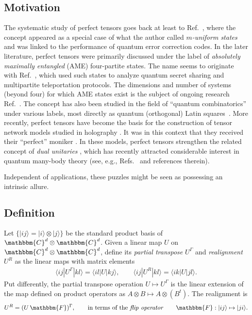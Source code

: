 \documentclass[aps,nofootinbib,floatfix,a4paper]{revtex4}
\newcommand{\1}{\mbox{$\mathbf{1}$}}
\def\CC{\mathbbm{C}}
\def\FF{\mathbbm{F}}
\begin{document}
\subsection{Motivation}

The systematic study of perfect tensors goes back at least to Ref.~\cite{Scott2004Multipartite}, where the concept appeared as a special case of what the author called \emph{$m$-uniform states} and was linked to the performance of quantum error correction codes.
In the later literature, perfect tensors were primarily discussed under the label of \emph{absolutely maximally entangled} (AME) four-partite states.
The name seems to originate with Ref.~\cite{Helwig2012Absolute}, which used such states to analyze quantum secret sharing and multipartite teleportation protocols.
The dimensions and number of systems 
(beyond four) 
for which AME states exist is the subject of ongoing research Ref.~\cite{Huber2018Bounds, huberAME, 
raissi2020constructions,
kwon2025continuous}.
The concept has also been studied in the field of ``quantum combinatorics'' 
\cite{Zauner1999Quantum}
under various labels, most directly as 
quantum (orthogonal) Latin squares~\cite{Musto2015Quantum, Musto2019Orthogonality, Goyeneche2018Entanglement, clarisse2005entangling,Zyczkowski2021Genuinely}.
More recently, perfect tensors have become the basis for the construction of tensor network models studied in holography \cite{pastawski2015holographic,latorre2015holographic}. 
It was in this context that they received their ``perfect'' moniker \cite{pastawski2015holographic}.
In these models, perfect tensors strengthen 
\cite{Rather2021From}
the related concept of \emph{dual unitaries} \cite{Bertini2019Exact}, which has recently attracted considerable interest in quantum many-body theory
(see, e.g., Refs.~\cite{Claeys2021Ergodic,
Pappalardi2024Quantum,
Rather2021From,
Yu2024Hierarchical}
and references therein). 

Independent of applications, these puzzles might be seen as possessing an intrinsic allure.

\subsection{Definition}
\label{sec:definition}

Let $\{|ij\rangle = |i\rangle\otimes |j\rangle\}$ be the standard product basis of $\CC^d\otimes \CC^d$.
Given a linear map $U$ on $\CC^d\otimes\CC^d$, 
define its \emph{partial transpose} $U^\Gamma$ and \emph{realignment} $U^R$ as the linear maps with matrix elements
\begin{align*}
	\langle ij|U^\Gamma|kl\rangle = \langle il|U|kj\rangle, %
	\qquad
	\langle ij|U^R|kl\rangle = \langle ik|U|jl\rangle.
\end{align*}
Put differently,
the partial transpose operation $U\mapsto U^\Gamma$ is the linear extension of the map defined on product operators as $A\otimes B \mapsto A \otimes (B^t)$.
The realignment is 
\begin{align}\label{eqn:realignment_flip}
	U^R = (U \, \FF)^\Gamma, \qquad\text{in terms of the \emph{flip operator}}\qquad \FF: |ij\rangle \mapsto |ji\rangle. 
\end{align}
\end{document}
